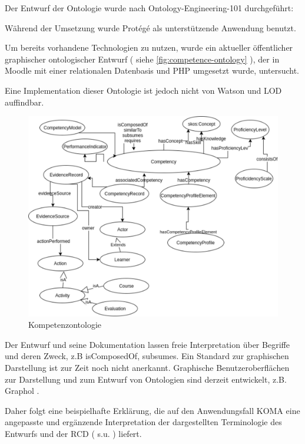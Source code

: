 \documentclass[
12pt,
english,
ngerman,
headsepline,
twoside,
openright,
numbers=noenddot,version=first
]{scrreprt}
\begin{document}
Der Entwurf der Ontologie wurde nach Ontology-Engineering-101 durchgeführt:

Während der Umsetzung wurde Protégé \cite{Protégé} als unterstützende Anwendung benutzt.

Um bereits vorhandene Technologien zu nutzen,
wurde ein aktueller öffentlicher graphischer ontologischer Entwurf\cite{ontoMoodle} ( siehe  \autoref{fig:competence-ontology} ), der in Moodle mit einer relationalen Datenbasis und PHP umgesetzt wurde, untersucht.

Eine Implementation dieser Ontologie ist jedoch nicht von Watson\cite{Watson} und LOD\cite{LOD} auffindbar.

\begin{figure}[h]
	\centering
	\includegraphics[angle=270]{pics/competency-ontology.eps}
	\caption{Kompetenzontologie}
	\label{fig:competence-ontology}
\end{figure}


Der Entwurf und seine Dokumentation lassen freie Interpretation über Begriffe und deren Zweck, z.B \glqq isComposedOf\grqq, \glqq subsumes\grqq. Ein Standard zur graphischen Darstellung ist zur Zeit noch nicht anerkannt. Graphische Benutzeroberflächen zur Darstellung und zum Entwurf von Ontologien sind derzeit entwickelt, z.B. Graphol \cite{graphol}.

Daher folgt eine beispielhafte Erklärung, die auf den Anwendungsfall \acrshort{KOMA} eine angepasste und ergänzende Interpretation der dargestellten Terminologie des Entwurfs und der \acrshort{RCD} ( s.u. ) liefert.
\end{document}
